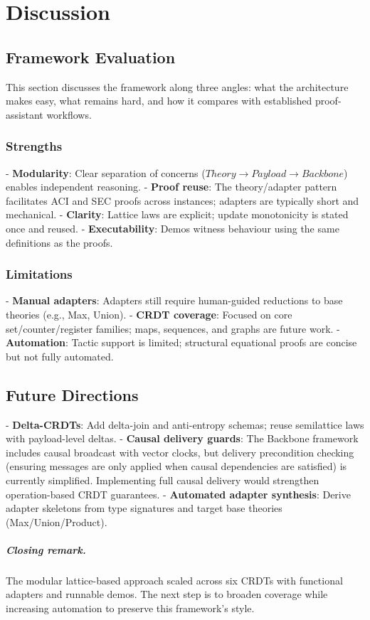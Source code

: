 
\chapter{Discussion}\label{chap:discussion}

\section{Framework Evaluation}\label{sec:discussion-eval}

This section discusses the framework along three angles: what the architecture makes easy, what remains hard, and how it compares with established proof-assistant workflows.

\subsection*{Strengths}
- \textbf{Modularity}: Clear separation of concerns ($Theory \to Payload \to Backbone$) enables independent reasoning.
- \textbf{Proof reuse}: The theory/adapter pattern facilitates ACI and SEC proofs across instances; adapters are typically short and mechanical.
- \textbf{Clarity}: Lattice laws are explicit; update monotonicity is stated once and reused.
- \textbf{Executability}: Demos witness behaviour using the same definitions as the proofs.

\subsection*{Limitations}
- \textbf{Manual adapters}: Adapters still require human-guided reductions to base theories (e.g., Max, Union).
- \textbf{CRDT coverage}: Focused on core set/counter/register families; maps, sequences, and graphs are future work.
- \textbf{Automation}: Tactic support is limited; structural equational proofs are concise but not fully automated.

\section{Future Directions}\label{sec:discussion-future}

- \textbf{Delta-CRDTs}: Add delta-join and anti-entropy schemas; reuse semilattice laws with payload-level deltas.
- \textbf{Causal delivery guards}: The Backbone framework includes causal broadcast with vector clocks, but delivery precondition checking (ensuring messages are only applied when causal dependencies are satisfied) is currently simplified. Implementing full causal delivery would strengthen operation-based CRDT guarantees.
- \textbf{Automated adapter synthesis}: Derive adapter skeletons from type signatures and target base theories (Max/Union/Product).

\paragraph{Closing remark.} The modular lattice-based approach scaled across six CRDTs with functional adapters and runnable demos. The next step is to broaden coverage while increasing automation to preserve this framework's style.    

\endinput
